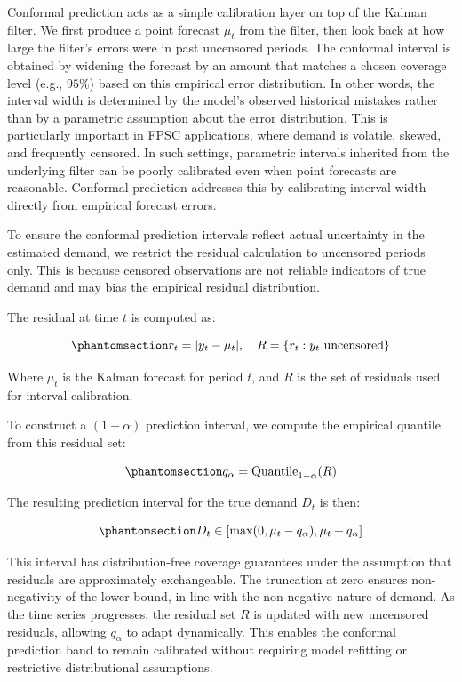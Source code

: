 \documentclass[
  11pt,
  authoryear,
  doubleblind,
  3p]{elsarticle}
\begin{document}
Conformal prediction acts as a simple calibration layer on top of the
Kalman filter. We first produce a point forecast \(\mu_t\) from the
filter, then look back at how large the filter's errors were in past
uncensored periods. The conformal interval is obtained by widening the
forecast by an amount that matches a chosen coverage level (e.g.,
\(95\%\)) based on this empirical error distribution. In other words,
the interval width is determined by the model's observed historical
mistakes rather than by a parametric assumption about the error
distribution. This is particularly important in FPSC applications, where
demand is volatile, skewed, and frequently censored. In such settings,
parametric intervals inherited from the underlying filter can be poorly
calibrated even when point forecasts are reasonable. Conformal
prediction addresses this by calibrating interval width directly from
empirical forecast errors.

To ensure the conformal prediction intervals reflect actual uncertainty
in the estimated demand, we restrict the residual calculation to
uncensored periods only. This is because censored observations are not
reliable indicators of true demand and may bias the empirical residual
distribution.

The residual at time \(t\) is computed as:

\begin{equation}\phantomsection\label{eq-thirteen}{
r_t = |y_t - \mu_t|, \quad R = \{r_t : y_t \text{ uncensored} \}
}\end{equation}

Where \(\mu_t\) is the Kalman forecast for period \(t\), and \(R\) is
the set of residuals used for interval calibration.

To construct a \((1 - \alpha)\) prediction interval, we compute the
empirical quantile from this residual set:

\begin{equation}\phantomsection\label{eq-fourteen}{
q_\alpha = \text{Quantile}_{1-\alpha}(R)
}\end{equation}

The resulting prediction interval for the true demand \(D_t\) is then:

\begin{equation}\phantomsection\label{eq-fifteen}{
D_t \in [\max(0, \mu_t - q_\alpha), \mu_t + q_\alpha]
}\end{equation}

This interval has distribution-free coverage guarantees under the
assumption that residuals are approximately exchangeable. The truncation
at zero ensures non-negativity of the lower bound, in line with the
non-negative nature of demand. As the time series progresses, the
residual set \(R\) is updated with new uncensored residuals, allowing
\(q_\alpha\) to adapt dynamically. This enables the conformal prediction
band to remain calibrated without requiring model refitting or
restrictive distributional assumptions.
\end{document}
